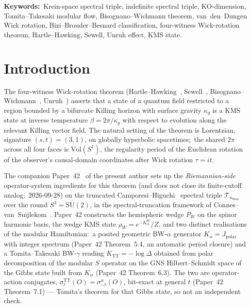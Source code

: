 \documentclass[11pt,a4paper]{article}
\theoremstyle{plain}
\theoremstyle{definition}
\newcommand{\nmax}{n_{\max}}
\newcommand{\sthree}{S^{3}}
\newcommand{\Tcal}{\mathcal{T}}
\newcommand{\SU}{\mathrm{SU}}
\newcommand{\Vol}{\mathrm{Vol}}
\newcommand{\TT}{\mathrm{TT}}
\begin{document}
\medskip\noindent
\textbf{Keywords:}\ Krein-space spectral triple, indefinite spectral
triple, KO-dimension, Tomita--Takesaki modular flow,
Bisognano--Wichmann theorem, van~den~Dungen Wick rotation,
Bizi--Brouder--Besnard classification,
four-witness Wick-rotation theorem, Hartle--Hawking, Sewell,
Unruh effect, KMS state.

\section{Introduction}\label{sec:intro}

The four-witness Wick-rotation theorem
(Hartle--Hawking~\cite{hartle_hawking1976}, Sewell~\cite{sewell1982},
Bisognano--Wichmann~\cite{bisognano_wichmann1976},
Unruh~\cite{unruh1976}) asserts that a state of a quantum field
restricted to a region bounded by a bifurcate Killing horizon with
surface gravity $\kappa_g$ is a KMS state at inverse temperature
$\beta = 2\pi / \kappa_g$ with respect to evolution along the
relevant Killing vector field. The natural setting of the theorem is
Lorentzian, signature $(s, t) = (3, 1)$, on globally hyperbolic
spacetimes;\ the shared $2\pi$ across all four faces is $\Vol(S^1)$,
the regularity period of the Euclidean rotation of the observer's
causal-domain coordinates after Wick rotation $\tau = i t$.

The companion Paper~42~\cite{paper42} of the present author sets up
the \emph{Riemannian-side} operator-system ingredients for this theorem
(and does not close its finite-cutoff analog;\ 2026-09-28) on the
truncated Camporesi--Higuchi~\cite{camporesi_higuchi1996} spectral
triple $\Tcal_{\nmax}$ over the round $\sthree = \SU(2)$, in the
spectral-truncation framework of
Connes--van~Suijlekom~\cite{connes_vs2021}. Paper~42 constructs the
hemispheric wedge $P_W$ on the spinor harmonic basis, the wedge KMS
state $\rho_W = e^{-K_\alpha^W}/Z$, and two distinct realisations of
the modular Hamiltonian:\ a posited geometric BW-$\alpha$ generator
$K_\alpha = J_{\mathrm{polar}}$ with integer spectrum
(Paper~42 Theorem~5.4, an automatic period closure) and a
Tomita--Takesaki BW-$\gamma$ reading $K_\TT = -\log \Delta$ obtained
from polar decomposition of the modular $S$ operator on the
GNS Hilbert--Schmidt space of the Gibbs state built from $K_\alpha$
(Paper~42 Theorem~6.3).
The two are operator-action conjugates,
$\sigma_t^\TT(O) = \sigma_{-t}^\alpha(O)$, bit-exact at general $t$
(Paper~42 Theorem~7.1) --- Tomita's theorem for that Gibbs state, so
not an independent check.
\end{document}
